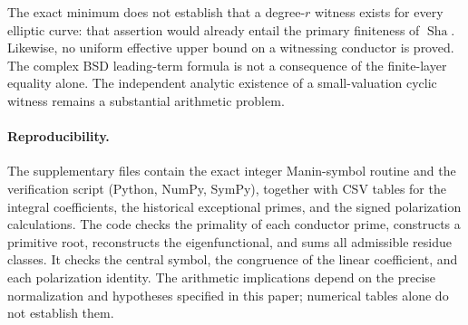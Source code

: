\documentclass[11pt]{article}
\theoremstyle{remark}\newtheorem{remark}[theorem]{Remark}
\newcommand{\Sha}{\operatorname{Sha}}
\begin{document}
The exact minimum does not establish that a degree-$r$ witness exists for every elliptic curve: that assertion would already entail the primary finiteness of $\Sha$. Likewise, no uniform effective upper bound on a witnessing conductor is proved. The complex BSD leading-term formula is not a consequence of the finite-layer equality alone. The independent analytic existence of a small-valuation cyclic witness remains a substantial arithmetic problem.

\paragraph{Reproducibility.} The supplementary files contain the exact integer Manin-symbol routine and the verification script (Python, NumPy, SymPy), together with CSV tables for the integral coefficients, the historical exceptional primes, and the signed polarization calculations. The code checks the primality of each conductor prime, constructs a primitive root, reconstructs the eigenfunctional, and sums all admissible residue classes. It checks the central symbol, the congruence of the linear coefficient, and each polarization identity. The arithmetic implications depend on the precise normalization and hypotheses specified in this paper; numerical tables alone do not establish them.
\end{document}

